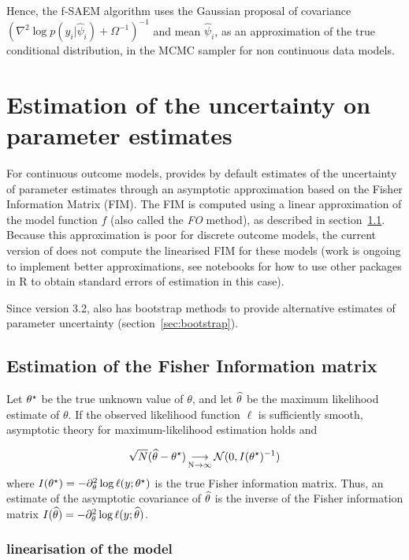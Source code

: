 Hence, the f-SAEM algorithm uses the Gaussian proposal of covariance $\left( \nabla^2 \log p(y_i|\hat{\psi}_i) + \Omega^{-1}\right)^{-1}$ and mean $\hat{\psi}_i$, as an approximation of the true conditional distribution, in the MCMC sampler for non continuous data models.

\section{Estimation of the uncertainty on parameter estimates} \label{sec:SE} 

For continuous outcome models, \saemix provides by default estimates of the uncertainty of parameter estimates through an asymptotic approximation based on the Fisher Information Matrix (FIM). The FIM is computed using a linear approximation of the model function $f$ (also called the {\itshape FO} method), as described in section~\ref{sec:FIM}. Because this approximation is poor for discrete outcome models, the current version of \saemix does not compute the linearised FIM for these models (work is ongoing to implement better approximations, see notebooks for how to use other packages in {\sf R} to obtain standard errors of estimation in this case).

Since version 3.2, \saemix also has bootstrap methods to provide alternative estimates of parameter uncertainty (section~\ref{sec:bootstrap}).

\subsection{Estimation of the Fisher Information matrix} \label{sec:FIM} 

Let ${\theta^\star}$ be the true unknown value of $\theta$, and let ${\widehat{\theta}}$ be the maximum likelihood estimate of $\theta$. If the observed likelihood function $\ell$ is sufficiently smooth, asymptotic theory for maximum-likelihood estimation holds and

\begin{equation}
\sqrt{N}({\widehat{\theta}}-{\theta^\star}) \mathop{\longrightarrow}\limits_{\mathrm{N\to \infty}}^{\mathrm{}} {\mathcal N}(0,I({\theta^\star})^{-1})
\end{equation}
where $I({\theta^\star})=- \partial^2_\theta \log \ell(y;{\theta^\star})$ is the true Fisher information matrix. Thus, an estimate of the asymptotic covariance of ${\widehat{\theta}}$ is the  inverse of the Fisher information matrix $I({\widehat{\theta}})=- \partial^2_\theta \log \ell(y;{\widehat{\theta}})$.

\subsubsection{linearisation of the model}


